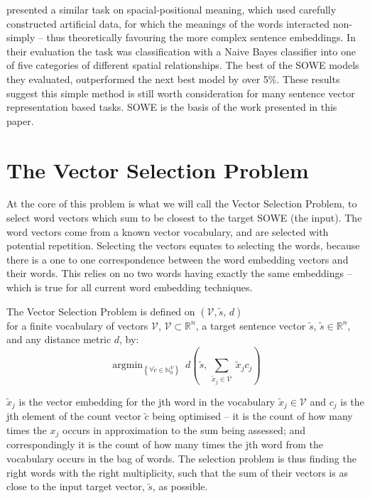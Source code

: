 \documentclass{llncs}
\DeclareMathOperator*{\argmin}{argmin}
\begin{document}
\textcite{RitterPosition} presented a similar task on spacial-positional meaning, which used carefully constructed artificial data, for which the meanings of the words interacted non-simply -- thus theoretically favouring the more complex sentence embeddings. In their evaluation the task was classification with a Naive Bayes classifier into one of five categories of different spatial relationships. The best of the SOWE models they evaluated, outperformed the next best model by over 5\%. These results suggest this simple method is still worth consideration for many sentence vector representation based tasks. SOWE is the basis of the work presented in this paper.

\section{The Vector Selection Problem}\label{framework}

At the core of this problem is what we will call the Vector Selection Problem, to select word vectors which sum to be closest to the target SOWE (the input). The word vectors come from a known vector vocabulary, and are selected with potential repetition.
Selecting the vectors equates to selecting the words, because there is a one to one correspondence between the word embedding vectors and their words. This relies on no two words having exactly the same embeddings -- which is true for all current word embedding techniques.

\renewcommand{\c}{\tilde{c}}
\newcommand{\s}{\tilde{s}}
\newcommand{\x}{\tilde{x}}
\renewcommand{\t}{\tilde{t}}
\newcommand{\N}{\mathbb{N}}
\newcommand{\R}{\mathbb{R}}
\newcommand{\V}{\mathcal{V}}

\begin{definition}{The Vector Selection Problem}
	is defined on $(\V, \s,\,d)$ \\for a finite vocabulary of vectors $\V$, $\V\subset{\R}^{n}$, a target sentence vector $ \s$, $ \s\in\R^{n}$, and any distance metric $d$, by:
		\[
		\argmin_{\left\{ \forall\c\in\N_{0}^{V}\right\} }\:d( \s,\,\sum_{\x_j\in\V}\:\x_{j}c_{j})
		\]
						
		$\x_{j}$ is the vector embedding for the jth word in the vocabulary
		$\x_{j}\in\V$ and $c_j$ is the jth element of the count vector $\c$ being optimised -- it is the count of how many times the $x_j$ occurs in approximation to the sum being assessed; and correspondingly it is the count of how many times the jth word from the vocabulary occurs in the bag of words.
		The selection problem is thus finding the right words with the right multiplicity, such that the sum of their vectors is as close to the input target vector, $\s$, as possible.
\end{definition}
\end{document}
